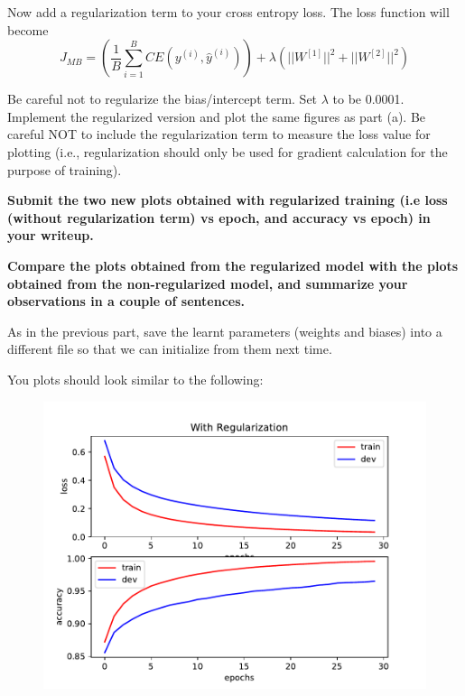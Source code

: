 \item {} Now add a regularization term to your cross entropy loss.
The loss function will become \begin{equation*}
  J_{MB} = \left(\frac{1}{B}\sum_{i=1}^{B}CE(y^{(i)}, \hat{y}^{(i)})\right) + \lambda \left(||W^{[1]}||^2 + ||W^{[2]}||^2 \right)
  \end{equation*}

Be careful not to regularize the bias/intercept term.
Set $\lambda$ to be 0.0001. Implement the regularized version and plot the same
figures as part (a). Be careful NOT to include the regularization term to measure
the loss value for plotting (i.e., regularization should only be used for gradient calculation for
the purpose of training).

\textbf{Submit the two new plots obtained with regularized training (i.e loss (without regularization term) vs epoch, and accuracy vs epoch) in your writeup.}

\textbf{Compare the plots obtained from the regularized model with the plots obtained
from the non-regularized model, and summarize your observations in a couple of sentences.}

As in the previous part, save the learnt parameters (weights and biases) into a
different file so that we can initialize from them next time.

\clearpage\newpage
You plots should look similar to the following:

\begin{figure}[H]
    \centering
    \includegraphics[scale=0.75]{mnist/src/regularized.pdf}
\end{figure}